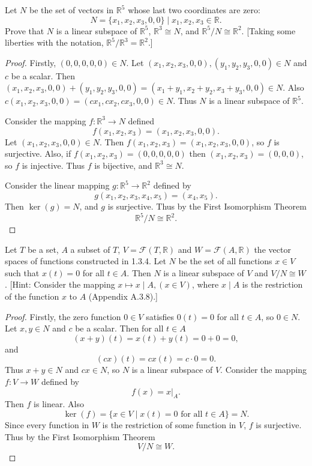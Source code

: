 \newpage
\begin{tcolorbox}[title=Problem 5, breakable]
    Let $N$ be the set of vectors in $\mathbb{R}^5$ whose last two coordinates are zero:
    \[N = \{x_1, x_2, x_3, 0, 0\} \mid x_1, x_2, x_3 \in \mathbb{R}.\]
    Prove that $N$ is a linear subspace of $\mathbb{R}^5$, $\mathbb{R}^3 \cong N$, 
        and $\mathbb{R}^5 / N \cong \mathbb{R}^2$.
    [Taking some liberties with the notation, $\mathbb{R}^5 / \mathbb{R}^3 = \mathbb{R}^2$.]
\end{tcolorbox}

\begin{proof}
    Firstly, $(0, 0, 0, 0, 0) \in N$.
    Let $(x_1, x_2, x_3, 0, 0), (y_1, y_2, y_3, 0, 0) \in N$ and $c$ be a scalar.
    Then $(x_1, x_2, x_3, 0, 0) + (y_1, y_2, y_3, 0, 0) = (x_1 + y_1, x_2 + y_2, x_3 + y_3, 0, 0) \in N$.
    Also $c(x_1, x_2, x_3, 0, 0) = (c x_1, c x_2, c x_3, 0, 0) \in N$.
    Thus $N$ is a linear subspace of $\mathbb{R}^5$.

    Consider the mapping $f : \mathbb{R}^3 \longrightarrow N$ defined 
    \[
        f(x_1, x_2, x_3) = (x_1, x_2, x_3, 0, 0).
    \]
    Let $(x_1, x_2, x_3, 0, 0) \in N$. Then $f(x_1, x_2, x_3) = (x_1, x_2, x_3, 0, 0)$, so $f$ is surjective.
    Also, if $f(x_1, x_2, x_3) = (0, 0, 0, 0, 0)$ then $(x_1, x_2, x_3) = (0, 0, 0)$, so $f$ is injective.
    Thus $f$ is bijective, and $\mathbb{R}^3 \cong N$.

    Consider the linear mapping $g : \mathbb{R}^5 \to \mathbb{R}^2$ defined by
    \[
        g(x_1, x_2, x_3, x_4, x_5) = (x_4, x_5).
    \]
    Then $\ker(g) = N$, and $g$ is surjective. Thus by the First Isomorphism Theorem
    \[
        \mathbb{R}^5 / N \cong \mathbb{R}^2.
    \]
\end{proof}

\begin{tcolorbox}[title=Problem 6, breakable]
    Let $T$ be a set, $A$ a subset of $T$, $V = \mathcal{F}(T, \mathbb{R})$ and $W = \mathcal{F}(A, \mathbb{R})$
        the vector spaces of functions constructed in 1.3.4. Let $N$ be the set of all functions $x \in V$
        such that $x(t) = 0$ for all $t \in A$. Then $N$ is a linear subspace of $V$ and $V / N \cong W$.
    [Hint: Consider the mapping $x \mapsto x \mid A, (x \in V)$, where $x \mid A$ is the restriction 
    of the function $x$ to $A$ (Appendix A.3.8).]
\end{tcolorbox}

\begin{proof}
    Firstly, the zero function $0 \in V$ satisfies $0(t) = 0$ for all $t \in A$, so $0 \in N$.
    Let $x, y \in N$ and $c$ be a scalar. Then for all $t \in A$
    \[
        (x + y)(t) = x(t) + y(t) = 0 + 0 = 0,
    \]
    and
    \[
        (cx)(t) = c x(t) = c \cdot 0 = 0.
    \]
    Thus $x + y \in N$ and $cx \in N$, so $N$ is a linear subspace of $V$.
    Consider the mapping $f : V \to W$ defined by
    \[
        f(x) = x|_A.
    \]
    Then $f$ is linear. Also
    \[
        \ker(f) = \{x \in V \mid x(t) = 0 \text{ for all } t \in A\} = N.
    \]
    Since every function in $W$ is the restriction of some function in $V$, $f$ is surjective.
    Thus by the First Isomorphism Theorem
    \[
        V/N \cong W.
    \]
\end{proof}